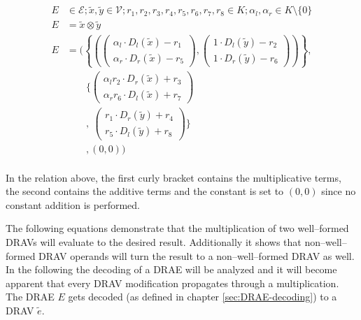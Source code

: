 


\begin{align*}
  E & \in \mathcal{E}; \widetilde{x}, \widetilde{y} \in \mathcal{V};
  r_1, r_2, r_3, r_4, r_5, r_6, r_7, r_8 \in K;
  \alpha_l, \alpha_r \in K \setminus \{0\} \\
  E & = \widetilde{x} \otimes \widetilde{y} \\
  E & = \Bigg(\left\{\left(
            \begin{pmatrix}
              \alpha_l \cdot D_l(\widetilde{x}) - r_1 \\
              \alpha_r \cdot D_r(\widetilde{x}) - r_5
            \end{pmatrix},
            \begin{pmatrix}
              1        \cdot D_l(\widetilde{y}) - r_2 \\
              1        \cdot D_r(\widetilde{y}) - r_6
            \end{pmatrix}
        \right)\right\}, \\
    &   \qquad\bigg\{
        \begin{pmatrix}
            \alpha_lr_2 \cdot D_r(\widetilde{x}) + r_3 \\
            \alpha_rr_6 \cdot D_l(\widetilde{x}) + r_7
          \end{pmatrix} \\
    &  \qquad,
        \ \begin{pmatrix}
            r_1        \cdot D_r(\widetilde{y}) + r_4 \\
            r_5        \cdot D_l(\widetilde{y}) + r_8
          \end{pmatrix}
        \bigg\} \\
    &  \qquad, (0, 0)
        \Bigg) \\
\end{align*}

\noindent{}In the relation above, the first curly bracket contains the
multiplicative terms, the second contains the additive terms and the constant is
set to $(0, 0)$ since no constant addition is performed.

The following equations demonstrate that the multiplication of two well--formed
DRAVs will evaluate to the desired result. Additionally it shows that
non--well--formed DRAV operands will turn the result to a non--well--formed DRAV
as well. In the following the decoding of a DRAE will be analyzed and it will
become apparent that every DRAV modification propagates through a
multiplication. The DRAE $E$ gets decoded (as defined in chapter
\ref{sec:DRAE-decoding}) to a DRAV $\widetilde{e}$.

